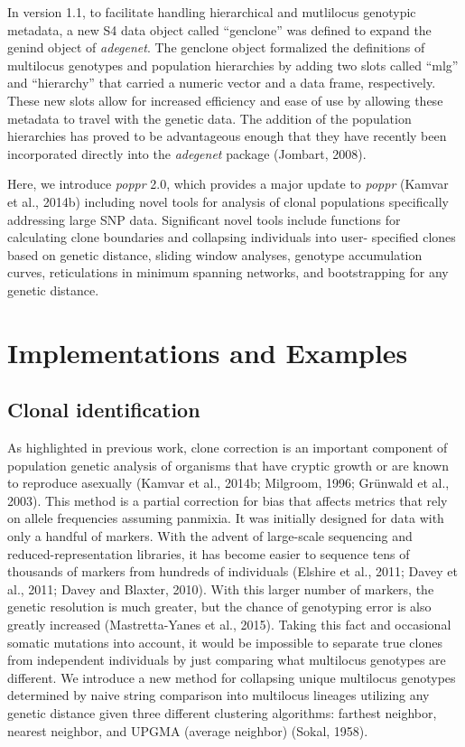 \documentclass{frontiersSCNS} %
\begin{document}
In version 1.1, to facilitate handling hierarchical and mutlilocus
genotypic metadata, a new S4 data object called ``genclone'' was defined
to expand the genind object of \emph{adegenet}. The genclone object
formalized the definitions of multilocus genotypes and population
hierarchies by adding two slots called ``mlg'' and ``hierarchy'' that
carried a numeric vector and a data frame, respectively. These new slots
allow for increased efficiency and ease of use by allowing these
metadata to travel with the genetic data. The addition of the population
hierarchies has proved to be advantageous enough that they have recently
been incorporated directly into the \emph{adegenet} package (Jombart,
2008).

Here, we introduce \emph{poppr} 2.0, which provides a major update to
\emph{poppr} (Kamvar et al., 2014b) including novel tools for analysis
of clonal populations specifically addressing large SNP data.
Significant novel tools include functions for calculating clone
boundaries and collapsing individuals into user- specified clones based
on genetic distance, sliding window analyses, genotype accumulation
curves, reticulations in minimum spanning networks, and bootstrapping
for any genetic distance.

\section*{Implementations and
Examples}\label{implementations-and-examples}

\subsection*{Clonal identification}\label{clonal-identification}

As highlighted in previous work, clone correction is an important
component of population genetic analysis of organisms that have cryptic
growth or are known to reproduce asexually (Kamvar et al., 2014b;
Milgroom, 1996; Grünwald et al., 2003). This method is a partial
correction for bias that affects metrics that rely on allele frequencies
assuming panmixia. It was initially designed for data with only a
handful of markers. With the advent of large-scale sequencing and
reduced-representation libraries, it has become easier to sequence tens
of thousands of markers from hundreds of individuals (Elshire et al.,
2011; Davey et al., 2011; Davey and Blaxter, 2010). With this larger
number of markers, the genetic resolution is much greater, but the
chance of genotyping error is also greatly increased (Mastretta-Yanes et
al., 2015). Taking this fact and occasional somatic mutations into
account, it would be impossible to separate true clones from independent
individuals by just comparing what multilocus genotypes are different.
We introduce a new method for collapsing unique multilocus genotypes
determined by naive string comparison into multilocus lineages utilizing
any genetic distance given three different clustering algorithms:
farthest neighbor, nearest neighbor, and UPGMA (average neighbor)
(Sokal, 1958).
\end{document}

